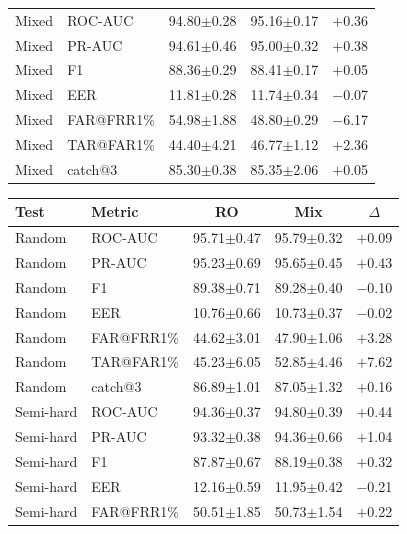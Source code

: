 \documentclass[11pt]{article}
\begin{document}
\begin{table}[!t]
\begin{minipage}[t]{0.48\textwidth}
\begin{tabular}{l l c c c}
\midrule
Mixed     & ROC-AUC    & 94.80$\pm$0.28 & 95.16$\pm$0.17 & $+$0.36 \\
Mixed     & PR-AUC     & 94.61$\pm$0.46 & 95.00$\pm$0.32 & $+$0.38 \\
Mixed     & F1         & 88.36$\pm$0.29 & 88.41$\pm$0.17 & $+$0.05 \\
Mixed     & EER        & 11.81$\pm$0.28 & 11.74$\pm$0.34 & $-$0.07 \\
Mixed     & FAR@FRR1\% & 54.98$\pm$1.88 & 48.80$\pm$0.29 & $-$6.17 \\
Mixed     & TAR@FAR1\% & 44.40$\pm$4.21 & 46.77$\pm$1.12 & $+$2.36 \\
Mixed     & catch@3    & 85.30$\pm$0.38 & 85.35$\pm$2.06 & $+$0.05 \\
\bottomrule
\end{tabular}
\label{tab:app_wc_minilm}
\end{minipage}%
\hfill
\begin{minipage}[t]{0.48\textwidth}
\centering
\begin{tabular}{l l c c c}
\toprule
\textbf{Test} & \textbf{Metric} & \textbf{RO} & \textbf{Mix} & \textbf{$\Delta$} \\
\midrule
Random    & ROC-AUC    & 95.71$\pm$0.47 & 95.79$\pm$0.32 & $+$0.09 \\
Random    & PR-AUC     & 95.23$\pm$0.69 & 95.65$\pm$0.45 & $+$0.43 \\
Random    & F1         & 89.38$\pm$0.71 & 89.28$\pm$0.40 & $-$0.10 \\
Random    & EER        & 10.76$\pm$0.66 & 10.73$\pm$0.37 & $-$0.02 \\
Random    & FAR@FRR1\% & 44.62$\pm$3.01 & 47.90$\pm$1.06 & $+$3.28 \\
Random    & TAR@FAR1\% & 45.23$\pm$6.05 & 52.85$\pm$4.46 & $+$7.62 \\
Random    & catch@3    & 86.89$\pm$1.01 & 87.05$\pm$1.32 & $+$0.16 \\
\midrule
Semi-hard & ROC-AUC    & 94.36$\pm$0.37 & 94.80$\pm$0.39 & $+$0.44 \\
Semi-hard & PR-AUC     & 93.32$\pm$0.38 & 94.36$\pm$0.66 & $+$1.04 \\
Semi-hard & F1         & 87.87$\pm$0.67 & 88.19$\pm$0.38 & $+$0.32 \\
Semi-hard & EER        & 12.16$\pm$0.59 & 11.95$\pm$0.42 & $-$0.21 \\
Semi-hard & FAR@FRR1\% & 50.51$\pm$1.85 & 50.73$\pm$1.54 & $+$0.22 \\

\end{tabular}
\end{minipage}
\end{table}
\end{document}
